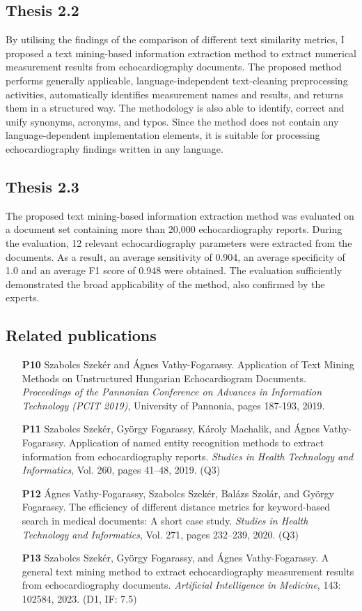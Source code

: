 \subsection*{Thesis 2.2}

By utilising the findings of the comparison of different text similarity metrics, I proposed a text mining-based information extraction method to extract numerical measurement results from echocardiography documents. The proposed method performs generally applicable, language-independent text-cleaning preprocessing activities, automatically identifies measurement names and results, and returns them in a structured way. The methodology is also able to identify, correct and unify synonyms, acronyms, and typos. Since the method does not contain any language-dependent implementation elements, it is suitable for processing echocardiography findings written in any language.

\subsection*{Thesis 2.3}

The proposed text mining-based information extraction method was evaluated on a document set containing more than 20,000 echocardiography reports. During the evaluation, 12 relevant echocardiography parameters were extracted from the documents. As a result, an average sensitivity of 0.904, an average specificity of 1.0 and an average F1 score of 0.948 were obtained. The evaluation sufficiently demonstrated the broad applicability of the method, also confirmed by the experts.

\subsection*{Related publications}

\begin{itemize}
	\item[\textbf{P10}] Szabolcs Szekér and Ágnes Vathy-Fogarassy. Application of Text Mining Methods on Unstructured Hungarian Echocardiogram Documents. \textit{Proceedings of the Pannonian Conference on Advances in Information Technology (PCIT 2019)}, University of Pannonia, pages 187-193, 2019. 
	\item[\textbf{P11}] Szabolcs Szekér, György Fogarassy, Károly Machalik, and Ágnes Vathy-Fogarassy. Application of named entity recognition methods to extract information from echocardiography reports. \textit{Studies in Health Technology and Informatics}, Vol. 260, pages 41–48, 2019. (Q3)
	\item[\textbf{P12}] Ágnes Vathy-Fogarassy, Szabolcs Szekér, Balázs Szolár, and György Fogarassy. The efficiency of different distance metrics for keyword-based search in medical documents: A short case study. \textit{Studies in Health Technology and Informatics}, Vol. 271, pages 232–239, 2020. (Q3) 	      	
	\item[\textbf{P13}] Szabolcs Szekér, György Fogarassy, and Ágnes Vathy-Fogarassy. A general text mining method to extract echocardiography measurement results from echocardiography documents. \textit{Artificial Intelligence in Medicine}, 143: 102584, 2023. (D1, IF: 7.5)
\end{itemize}
